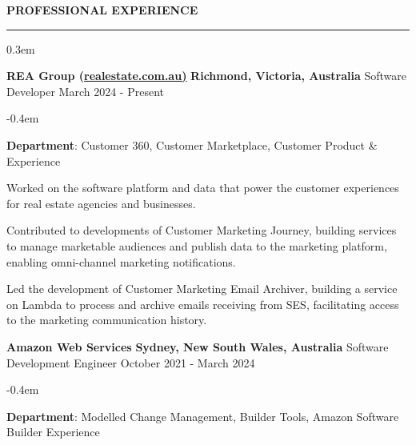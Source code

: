 \documentclass{cv}
\begin{document}
\medskip


 \textbf{PROFESSIONAL EXPERIENCE}
\sectionlineskip
\hrule
\begin{list}{}{\setlength{\leftmargin}{0em}}
\itemsep 0.3em
\item
    \textbf{REA Group (\href{https://realestate.com.au/}{realestate.com.au)}} \hfill \textbf{Richmond, Victoria, Australia}%
    \vspace{0.1em} \newline 
    {Software Developer} \hfill {March 2024 - Present}%
    \begin{list}{\raisebox{0.2em}{\tiny$\bullet$} \hspace{0em}}{\setlength{\leftmargin}{2.0em}}
        \itemsep -0.4em \vspace{-0.4em}
        \item \textbf{Department}: Customer 360, Customer Marketplace, Customer Product \& Experience
        \item Worked on the software platform and data that power the customer experiences for real estate agencies and businesses.
        \item Contributed to developments of Customer Marketing Journey, building services to manage marketable audiences and publish data to the marketing platform, enabling omni-channel marketing notifications.
        \item Led the development of Customer Marketing Email Archiver, building a service on Lambda to process and archive emails receiving from SES, facilitating access to the marketing communication history.
    \end{list}
\item 
    \textbf{Amazon Web Services} \hfill \textbf{Sydney, New South Wales, Australia}%
    \vspace{0.1em} \newline 
    {Software Development Engineer} \hfill {October 2021 - March 2024}%
    \begin{list}{\raisebox{0.2em}{\tiny$\bullet$} \hspace{0em}}{\setlength{\leftmargin}{2.0em}}
        \itemsep -0.4em \vspace{-0.4em}
        \item \textbf{Department}: Modelled Change Management, Builder Tools, Amazon Software Builder Experience

\end{list}
\end{list}
\end{document}
